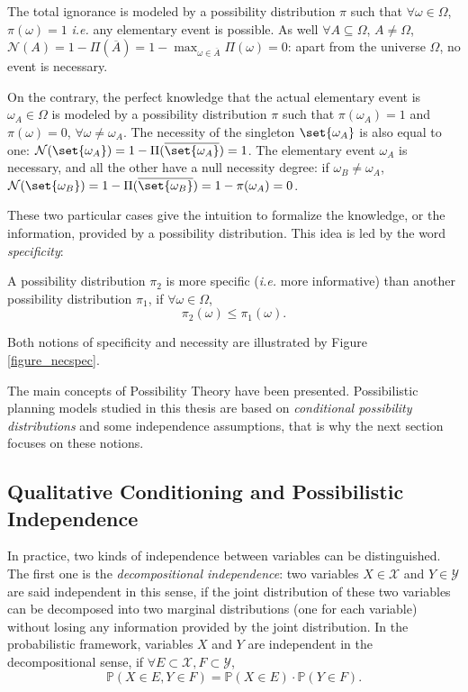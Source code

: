 The total ignorance is modeled by a possibility distribution $\pi$ such that $\forall \omega \in \Omega$,
$\pi(\omega)=1$ \textit{i.e.} any elementary event is possible.
As well $\forall A \subseteq \Omega$, $A \neq \Omega$, $\mathcal{N}(A)=1-\Pi(\overline{A})=1-\max_{\omega \in \overline{A}} \Pi(\omega)=0$:
apart from the universe $\Omega$,
no event is necessary. 

On the contrary, the perfect knowledge that the actual elementary event is $\omega_A \in \Omega$
is modeled by a possibility distribution $\pi$ such that $\pi(\omega_A) = 1$
and $\pi(\omega)=0$, $\forall \omega \neq \omega_A$. The necessity of the singleton $\set{\omega_A}$
is also equal to one: $\mathcal{N}(\set{\omega_A})=1-\Pi(\overline{\set{\omega_A }}) = 1$. 
The elementary event $\omega_A$ is necessary, and all the other have a null necessity degree:
if $\omega_B \neq \omega_A$, $\mathcal{N}(\set{\omega_B})=1-\Pi(\overline{\set{\omega_B }}) = 1 - \pi(\omega_A) = 0$.

These two particular cases give the intuition to formalize the knowledge, 
or the information, provided by a possibility distribution.
This idea is led by the word \textit{specificity}:
\begin{Def}[Specificity]
\label{def_specificity}
A possibility distribution $\pi_2$ is more specific (\textit{i.e.} more informative) than another possibility distribution $\pi_1$, if $\forall \omega \in \Omega$,
\[ \pi_2(\omega) \leqslant \pi_1(\omega).\]
\end{Def}
Both notions of specificity and necessity are illustrated by Figure \ref{figure_necspec}.

The main concepts of Possibility Theory have been presented.
Possibilistic planning models studied in this thesis 
are based on \textit{conditional possibility distributions}	 
and some independence assumptions, that is why
the next section focuses on these notions.

\subsection{Qualitative Conditioning and Possibilistic Independence}
\label{qualitative_indep}
In practice, two kinds of independence between variables can be distinguished. 
The first one is the \textit{decompositional independence}:
two variables $X \in \mathcal{X}$ and $Y \in \mathcal{Y}$ 
are said independent in this sense,
if the joint distribution of these two variables
can be decomposed into two marginal distributions
(one for each variable)
without losing any information
provided by the joint distribution. 
In the probabilistic framework,
variables $X$
and $Y$ are independent 
in the decompositional sense, if $\forall E \subset \mathcal{X}, F \subset \mathcal{Y}$,
\begin{equation}
\label{decompositional_indep}
\mathbb{P}(X \in E, Y \in F) = \mathbb{P}(X \in E) \cdot \mathbb{P}(Y \in F).
\end{equation}


